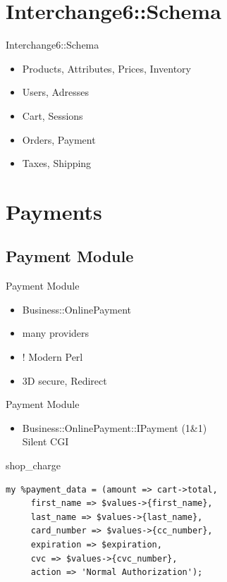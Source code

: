 \section{Interchange6::Schema}
\begin{frame}{Interchange6::Schema}
\begin{itemize}
 \item Products, Attributes, Prices, Inventory 
 \item Users, Adresses
 \item Cart, Sessions
 \item Orders, Payment
 \item Taxes, Shipping
\end{itemize}
\end{frame}

\section{Payments}
\subsection{Payment Module}
\begin{frame}{Payment Module}
\begin{itemize}
\item Business::OnlinePayment
\item many providers
\item ! Modern Perl
\item 3D secure, Redirect
\end{itemize}
\end{frame}

\begin{frame}{Payment Module}
\begin{itemize}
\item Business::OnlinePayment::IPayment (1\&1) \\
Silent CGI
\end{itemize}
\end{frame}

\begin{frame}[fragile]{shop\_charge}
\begin{lstlisting}
my %payment_data = (amount => cart->total,
     first_name => $values->{first_name},
     last_name => $values->{last_name},
     card_number => $values->{cc_number},
     expiration => $expiration,
     cvc => $values->{cvc_number},
     action => 'Normal Authorization');
\end{lstlisting}
\end{frame}

